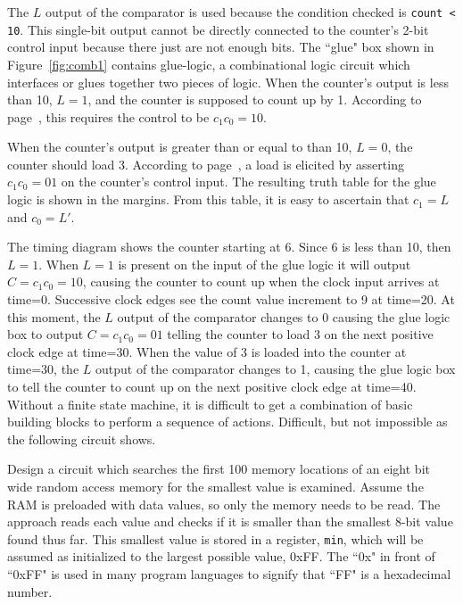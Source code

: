 The $L$ output of the comparator is used because the condition checked is 
\verb+count < 10+.  This single-bit output cannot be directly connected to the
counter's 2-bit control input because there just are not enough bits.  The
``glue" box shown in Figure~\ref{fig:comb1} contains glue-logic, a
combinational logic circuit which interfaces or glues together two pieces
of logic.  When the counter's output is less than 10, $L=1$, and the
counter is supposed to count up by 1.  According to 
page~\pageref{page:counter}, this requires the control to be $c_1c_0=10$.

When the counter's output is greater than or equal to than 10, $L=0$, 
the counter should load 3.  According to 
page~\pageref{page:counter}, a load is elicited by asserting 
$c_1c_0=01$ on the counter's control input.  The 
resulting truth table for the glue logic is shown in the margins.  
From this table, it is easy to ascertain that $c_1 = L$ and $c_0 = L'$.


The timing diagram shows the counter starting at 6.  Since 6 is less 
than 10, then $L=1$.  When $L=1$ is present on the input of the
glue logic it will output $C=c_1c_0=10$, causing the counter
to count up when the clock input arrives at time=0.  Successive clock edges
see the count value increment to 9 at time=20.  At this moment, the $L$ output
of the comparator changes to 0 causing the glue logic box to output 
$C=c_1c_0=01$ telling the counter to load 3 on the next positive clock edge 
at time=30.  When the value of 3 is loaded into the counter at time=30, the
$L$ output of the comparator changes to 1, causing the glue logic box to
tell the counter to count up on the next positive clock edge at time=40.
Without a finite state machine, it is difficult to get a combination of basic 
building blocks to perform a sequence of actions. Difficult, but not 
impossible as the following circuit shows.
 
Design a circuit which searches the first 
100 memory locations of an eight bit wide random access memory for the smallest 
value is examined.  Assume the RAM is preloaded with data values, so 
only the memory needs to be read.  The approach reads each value 
and checks if it is smaller than the smallest 8-bit value found
thus far.  This smallest value is stored in a register, \verb+min+, which
will be assumed as initialized to the largest possible value, 0xFF.  The ``0x"
in front of ``0xFF" is used in many program languages to signify that 
``FF" is a hexadecimal number.
\label{page:minsearch} 

